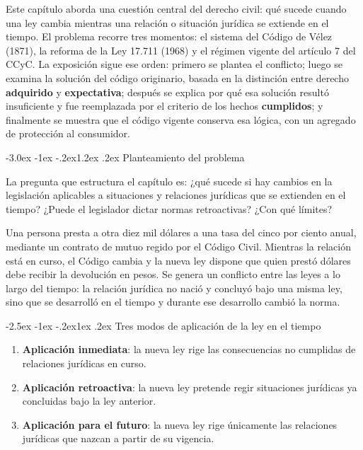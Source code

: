 \documentclass[12pt,oneside]{book}
\makeatletter
\renewcommand\section{\@startsection{section}{1}{\z@}%
  {-3.0ex \@plus -1ex \@minus -.2ex}{1.2ex \@plus .2ex}%
  {\normalfont\large\bfseries\color{acento}}}
\renewcommand\subsection{\@startsection{subsection}{2}{\z@}%
  {-2.5ex \@plus -1ex \@minus -.2ex}{1ex \@plus .2ex}%
  {\normalfont\normalsize\bfseries}}
\makeatother
\begin{document}
Este capítulo aborda una cuestión central del derecho civil: qué sucede cuando una ley cambia mientras una relación o situación jurídica se extiende en el tiempo. El problema recorre tres momentos: el sistema del Código de Vélez (1871), la reforma de la Ley 17.711 (1968) y el régimen vigente del artículo 7 del CCyC. La exposición sigue ese orden: primero se plantea el conflicto; luego se examina la solución del código originario, basada en la distinción entre derecho \textbf{adquirido} y \textbf{expectativa}; después se explica por qué esa solución resultó insuficiente y fue reemplazada por el criterio de los hechos \textbf{cumplidos}; y finalmente se muestra que el código vigente conserva esa lógica, con un agregado de protección al consumidor.

\section{Planteamiento del problema}

La pregunta que estructura el capítulo es: ¿qué sucede si hay cambios en la legislación aplicables a situaciones y relaciones jurídicas que se extienden en el tiempo? ¿Puede el legislador dictar normas retroactivas? ¿Con qué límites?

\begin{ejemplo}
Una persona presta a otra diez mil dólares a una tasa del cinco por ciento anual, mediante un contrato de mutuo regido por el Código Civil. Mientras la relación está en curso, el Código cambia y la nueva ley dispone que quien prestó dólares debe recibir la devolución en pesos. Se genera un conflicto entre las leyes a lo largo del tiempo: la relación jurídica no nació y concluyó bajo una misma ley, sino que se desarrolló en el tiempo y durante ese desarrollo cambió la norma.
\end{ejemplo}

\subsection{Tres modos de aplicación de la ley en el tiempo}

\begin{enumerate}
\item \textbf{Aplicación inmediata}: la nueva ley rige las consecuencias no cumplidas de relaciones jurídicas en curso.
\item \textbf{Aplicación retroactiva}: la nueva ley pretende regir situaciones jurídicas ya concluidas bajo la ley anterior.
\item \textbf{Aplicación para el futuro}: la nueva ley rige únicamente las relaciones jurídicas que nazcan a partir de su vigencia.
\end{enumerate}
\end{document}
